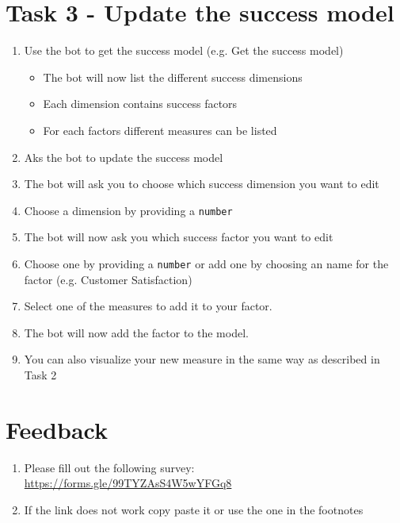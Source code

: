 \section*{Task 3 - Update the success model}
\begin{enumerate}
    \item Use the bot to get the success model (e.g. Get the success model)
    \begin{itemize}
        \item The bot will now list the different success dimensions
        \item Each dimension contains success factors
        \item For each factors different measures can be listed
    \end{itemize}
    \item Aks the bot to update the success model
    \item The bot will ask you to choose which success dimension you want to edit
    \item Choose a dimension by providing a \texttt{number}
    \item The bot will now ask you which success factor you want to edit
    \item Choose one by providing a \texttt{number} or add one by choosing an name for the factor (e.g. Customer Satisfaction)
    \item Select one of the measures to add it to your factor. 
    \item The bot will now add the factor to the model.
    \item You can also visualize your new measure in the same way as described in Task 2
\end{enumerate}

\section*{Feedback}
  
\begin{enumerate}
  \item Please fill out the following survey: \url{https://forms.gle/99TYZAsS4W5wYFGq8}
  \item If the link does not work copy paste it or use the one in the footnotes \footnotemark 
\end{enumerate}

